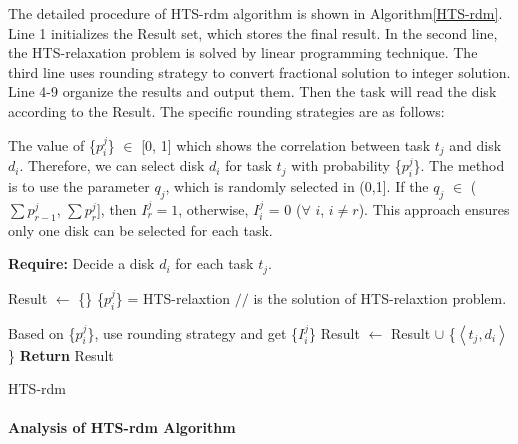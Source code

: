 \documentclass[conference]{IEEEtran}
\begin{document}
 The detailed procedure of HTS-rdm algorithm is shown in Algorithm\ref{HTS-rdm}. Line 1 initializes the Result set, which stores the final result. In the second line, the HTS-relaxation problem is solved by linear programming technique. The third line uses rounding strategy to convert fractional solution to integer solution. Line 4-9 organize the results and output them. Then the task will read the disk according to the Result. The specific rounding strategies are as follows:
 
 The value of \{$p_i^j$\}  $\in$ [0, 1] which shows the correlation between task $t_j$ and disk $d_i$. Therefore, we can select disk $d_i$ for task $t_j$ with  probability \{$p_i^j$\}. The method is to use the parameter $q_j$, which is randomly selected in (0,1]. If the $q_j$ $\in$ ($\sum p_{r-1}^{j}$, $\sum p_{r}^{j}$], then $I_r^j = 1$, otherwise, $I_i^j$ = 0 ($\forall$ $i$, $i \ne r$). This approach ensures only one disk can be selected for each task.%
 \begin{algorithm}
 	
 	\textbf{Require:} Decide a disk $d_i$ for each task $t_j$. %
 	\begin{algorithmic}[1]
 		
 		\State Result $\gets$ \{\}
 		\State \{$p_i^j$\} = HTS-relaxtion		
 		$//$ is the solution of HTS-relaxtion problem. 
 		
 		\State Based on \{$p_i^j$\}, use rounding strategy and get \{$I_i^j$\}
 			\State Result $\gets$ Result $\cup$ 	
 			\{$\left \langle t_j, d_i\right \rangle$\}
 			\EndIf
 		\EndFor	
 		\State \textbf{Return} Result	
 	\end{algorithmic}
 	\caption{HTS-rdm}\label{HTS-rdm}
 \end{algorithm}

\paragraph{\textbf{Analysis of HTS-rdm Algorithm}}
\end{document}
